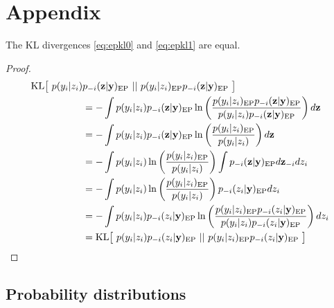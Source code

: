 \section{Appendix}

\begin{prop}\label{pr:kleq}
  The KL divergences \eqref{eq:epkl0} and \eqref{eq:epkl1} are equal.
\end{prop}

\begin{proof}
  \begin{align*}
      \mathrm{KL}\big[~  p(y_i|z_i) &p_{-i}(\mathbf z|\mathbf y)_{\text{EP}}  ~||~  p(y_i|z_i)_{\text{EP}} p_{-i}(\mathbf z|\mathbf y)_{\text{EP}}  ~\big]\\
          &=-\int p(y_i|z_i) p_{-i}(\mathbf z|\mathbf y)_{\text{EP}} \ln \left(
          \frac{p(y_i|z_i)_{\text{EP}} p_{-i}(\mathbf z|\mathbf y)_{\text{EP}}}{p(y_i|z_i) p_{-i}(\mathbf z|\mathbf y)_{\text{EP}}} \right) d\mathbf z\\
          &=-\int p(y_i|z_i) p_{-i}(\mathbf z|\mathbf y)_{\text{EP}} \ln \left(\frac{p(y_i|z_i)_{\text{EP}}}{p(y_i|z_i)}\right)d\mathbf z\\
          &=-\int p(y_i|z_i) \ln \left( \frac{p(y_i|z_i)_{\text{EP}}}{p(y_i|z_i)} \right)
          \int p_{-i}(\mathbf z|\mathbf y)_{\text{EP}} d\mathbf z_{-i} dz_i\\
          &=-\int p(y_i|z_i) \ln \left( \frac{p(y_i|z_i)_{\text{EP}}}{p(y_i|z_i)} \right)
          p_{-i}(z_i|\mathbf y)_{\text{EP}} dz_i\\
          &=-\int p(y_i|z_i) p_{-i}(z_i|\mathbf y)_{\text{EP}} \ln \left(
          \frac{p(y_i|z_i)_{\text{EP}} p_{-i}(z_i|\mathbf y)_{\text{EP}}}{p(y_i|z_i) p_{-i}(z_i|\mathbf y)_{\text{EP}}} \right) dz_i\\
          &= \mathrm{KL}\big[~  p(y_i|z_i) p_{-i}(z_i|\mathbf y)_{\text{EP}}  ~||~  p(y_i|z_i)_{\text{EP}} p_{-i}(z_i|\mathbf y)_{\text{EP}}  ~\big]
  \end{align*}

\end{proof}

\subsection{Probability distributions}

